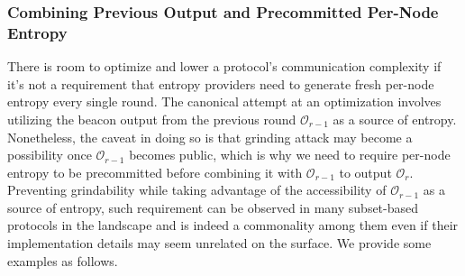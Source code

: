 \documentclass[letterpaper,twocolumn,10pt]{article}
\theoremstyle{definition}
\theoremstyle{remark}
\begin{document}
\subsubsection{Combining Previous Output and Precommitted Per-Node Entropy}
There is room to optimize and lower a protocol's communication complexity if it's not a requirement that entropy providers need to generate fresh per-node entropy every single round. The canonical attempt at an optimization involves utilizing the beacon output from the previous round $\mathcal{O}_{r - 1}$ as a source of entropy. Nonetheless, the caveat in doing so is that grinding attack may become a possibility once $\mathcal{O}_{r - 1}$ becomes public, which is why we need to require per-node entropy to be precommitted before combining it with $\mathcal{O}_{r - 1}$ to output $\mathcal{O}_r$. Preventing grindability while taking advantage of the accessibility of $\mathcal{O}_{r - 1}$ as a source of entropy, such requirement can be observed in many subset-based protocols in the landscape and is indeed a commonality among them even if their implementation details may seem unrelated on the surface. We provide some examples as follows.
\end{document}
